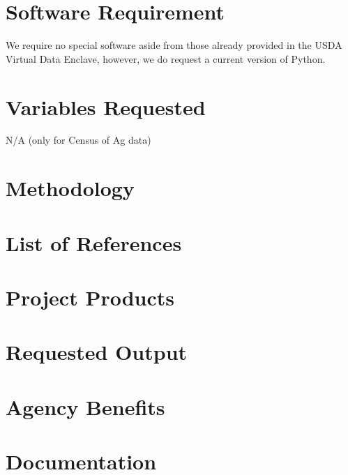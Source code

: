 \documentclass{article}
\begin{document}
\section*{Software Requirement} 
We require no special software aside from those already provided in the USDA Virtual Data Enclave, however, we do request 
a current version of Python. 


\section*{Variables Requested}
N/A (only for Census of Ag data)

\section*{Methodology} 



\section*{List of References}


\section*{Project Products} 



\section*{Requested Output} 


\section*{Agency Benefits} 

\section*{Documentation}
\end{document}

